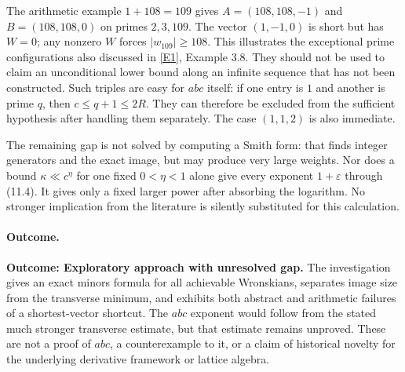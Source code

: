 \documentclass[11pt,a4paper]{article}
\newcommand{\eref}[2]{\hyperlink{extra:#1:#2}{[E#2]}}
\begin{document}
The arithmetic example $1+108=109$ gives
$A=(108,108,-1)$ and $B=(108,108,0)$ on primes $2,3,109$.
The vector $(1,-1,0)$ is short but has $W=0$; any nonzero $W$ forces
$|w_{109}|\geq108$. This illustrates the exceptional prime configurations
also discussed in \eref{statement}{1}, Example 3.8. They should not be used to
claim an unconditional lower bound along an infinite sequence that has
not been constructed. Such triples are easy for $abc$ itself: if one
entry is $1$ and another is prime $q$, then $c\leq q+1\leq2R$.
They can therefore be excluded from the sufficient hypothesis after
handling them separately. The case $(1,1,2)$ is also immediate.

The remaining gap is not solved by computing a Smith form: that finds
integer generators and the exact image, but may produce very large
weights. Nor does a bound $\kappa\ll c^\eta$ for one fixed
$0<\eta<1$ alone give every exponent $1+\varepsilon$ through (11.4).
It gives only a fixed larger power after absorbing the logarithm. No
stronger implication from the literature is silently substituted for
this calculation.

\paragraph{Outcome.}
\textbf{Outcome: Exploratory approach with unresolved gap.}
The investigation gives an exact minors formula for all achievable
Wronskians, separates image size from the transverse minimum, and
exhibits both abstract and arithmetic failures of a shortest-vector
shortcut. The $abc$ exponent would follow from the stated much stronger
transverse estimate, but that estimate remains unproved. These are
not a proof of $abc$, a counterexample to it, or a claim of historical
novelty for the underlying derivative framework or lattice algebra.
\end{document}
